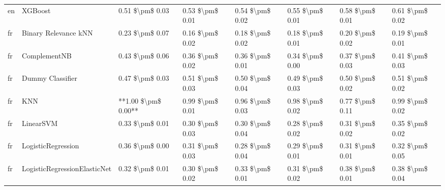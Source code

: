 \begin{tabular}{llllllll}
      en &                         XGBoost &     0.51 \$\textbackslash pm\$ 0.03 &           0.53 \$\textbackslash pm\$ 0.01 &       0.54 \$\textbackslash pm\$ 0.02 &        0.55 \$\textbackslash pm\$ 0.01 &                         0.58 \$\textbackslash pm\$ 0.01 &     0.61 \$\textbackslash pm\$ 0.02 \\
      fr &            Binary Relevance kNN &     0.23 \$\textbackslash pm\$ 0.07 &           0.16 \$\textbackslash pm\$ 0.02 &       0.18 \$\textbackslash pm\$ 0.02 &        0.18 \$\textbackslash pm\$ 0.01 &                         0.20 \$\textbackslash pm\$ 0.02 &     0.19 \$\textbackslash pm\$ 0.01 \\
      fr &                    ComplementNB &     0.43 \$\textbackslash pm\$ 0.06 &           0.36 \$\textbackslash pm\$ 0.02 &       0.36 \$\textbackslash pm\$ 0.01 &        0.34 \$\textbackslash pm\$ 0.00 &                         0.37 \$\textbackslash pm\$ 0.03 &     0.41 \$\textbackslash pm\$ 0.03 \\
      fr &                Dummy Classifier &     0.47 \$\textbackslash pm\$ 0.03 &           0.51 \$\textbackslash pm\$ 0.03 &       0.50 \$\textbackslash pm\$ 0.04 &        0.49 \$\textbackslash pm\$ 0.03 &                         0.50 \$\textbackslash pm\$ 0.02 &     0.51 \$\textbackslash pm\$ 0.02 \\
      fr &                             KNN & **1.00 \$\textbackslash pm\$ 0.00** &           0.99 \$\textbackslash pm\$ 0.01 &       0.96 \$\textbackslash pm\$ 0.03 &        0.98 \$\textbackslash pm\$ 0.02 &                         0.77 \$\textbackslash pm\$ 0.11 &     0.99 \$\textbackslash pm\$ 0.02 \\
      fr &                       LinearSVM &     0.33 \$\textbackslash pm\$ 0.01 &           0.30 \$\textbackslash pm\$ 0.03 &       0.30 \$\textbackslash pm\$ 0.04 &        0.28 \$\textbackslash pm\$ 0.02 &                         0.31 \$\textbackslash pm\$ 0.02 &     0.35 \$\textbackslash pm\$ 0.02 \\
      fr &              LogisticRegression &     0.36 \$\textbackslash pm\$ 0.00 &           0.31 \$\textbackslash pm\$ 0.03 &       0.28 \$\textbackslash pm\$ 0.04 &        0.29 \$\textbackslash pm\$ 0.01 &                         0.31 \$\textbackslash pm\$ 0.01 &     0.32 \$\textbackslash pm\$ 0.05 \\
      fr &    LogisticRegressionElasticNet &     0.32 \$\textbackslash pm\$ 0.01 &           0.30 \$\textbackslash pm\$ 0.02 &       0.33 \$\textbackslash pm\$ 0.01 &        0.31 \$\textbackslash pm\$ 0.02 &                         0.38 \$\textbackslash pm\$ 0.01 &     0.38 \$\textbackslash pm\$ 0.04 \\

\end{tabular}
